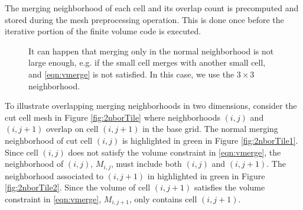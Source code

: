 The merging neighborhood of each cell and its overlap count is precomputed and stored during the mesh preprocessing operation.  This is done once before the iterative portion of the finite volume code is executed.
\begin{figure}
\hspace*{.5in}
	\hfill
	\caption{\sf It can happen that merging only in the normal neighborhood is not 
        large enough, e.g. if the small cell merges with another small cell, and \eqref{eqn:vmerge} is not satisfied.  In this case, we use the $3\times 3$ neighborhood. }
\end{figure}


To illustrate overlapping merging neighborhoods in two dimensions, consider the cut cell mesh in Figure \ref{fig:2nborTile} where neighborhoods $(i,j)$ and $(i,j+1)$ overlap on cell $(i,j+1)$ in the base grid.  The normal merging neighborhood of cut cell $(i,j)$ is highlighted in green in Figure \ref{fig:2nborTile1}.  
Since cell $(i,j)$ does not satisfy the volume constraint in \eqref{eqn:vmerge}, the neighborhood of $(i,j)$, $M_{i,j}$, must include both $(i,j)$ and $(i,j+1)$.  
The neighborhood associated to $(i,j+1)$ in highlighted in green in Figure \ref{fig:2nborTile2}.  Since the volume of cell $(i,j+1)$ satisfies the volume constraint in \eqref{eqn:vmerge}, $M_{i,j+1}$, only contains cell $(i,j+1)$.
  


